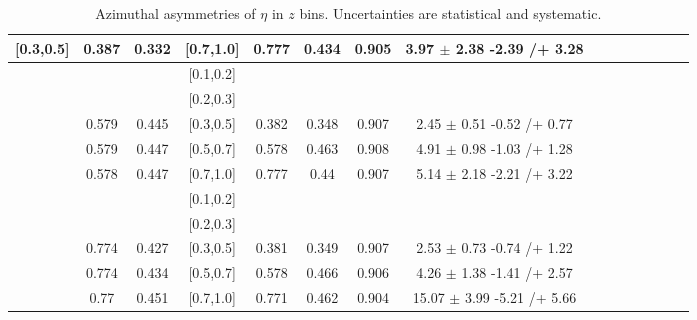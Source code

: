 \begin{table}[H]
\begin{tabular}{|c| c| c| c| c| c| c| c| c| c|c| c| c| c| c|}
[0.3,0.5]	&	0.387	&	0.332	&	[0.7,1.0]	&	0.777	&	0.434	&	0.905	&	3.97	$\pm$	2.38	-2.39	/+	3.28	\\ \hline
[0.5,0.7]	&		&		&	[0.1,0.2]	&		&		&		&							\\ \hline
[0.5,0.7]	&		&		&	[0.2,0.3]	&		&		&		&							\\ \hline
[0.5,0.7]	&	0.579	&	0.445	&	[0.3,0.5]	&	0.382	&	0.348	&	0.907	&	2.45	$\pm$	0.51	-0.52	/+	0.77	\\ \hline
[0.5,0.7]	&	0.579	&	0.447	&	[0.5,0.7]	&	0.578	&	0.463	&	0.908	&	4.91	$\pm$	0.98	-1.03	/+	1.28	\\ \hline
[0.5,0.7]	&	0.578	&	0.447	&	[0.7,1.0]	&	0.777	&	0.44	&	0.907	&	5.14	$\pm$	2.18	-2.21	/+	3.22	\\ \hline
[0.7,1.0]	&		&		&	[0.1,0.2]	&		&		&		&							\\ \hline
[0.7,1.0]	&		&		&	[0.2,0.3]	&		&		&		&							\\ \hline
[0.7,1.0]	&	0.774	&	0.427	&	[0.3,0.5]	&	0.381	&	0.349	&	0.907	&	2.53	$\pm$	0.73	-0.74	/+	1.22	\\ \hline
[0.7,1.0]	&	0.774	&	0.434	&	[0.5,0.7]	&	0.578	&	0.466	&	0.906	&	4.26	$\pm$	1.38	-1.41	/+	2.57	\\ \hline
[0.7,1.0]	&	0.77	&	0.451	&	[0.7,1.0]	&	0.771	&	0.462	&	0.904	&	15.07	$\pm$	3.99	-5.21	/+	5.66	\\ \hline
\end{tabular}
\caption{Azimuthal asymmetries of $\eta$ in $z$ bins. Uncertainties are statistical and systematic.}
\label{tab:finaletazbin}
\end{table}

